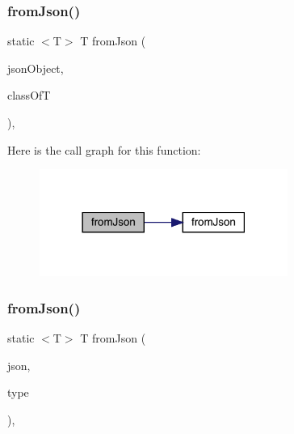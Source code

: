 \subsubsection{\texorpdfstring{from\+Json()}{fromJson()}\hspace{0.1cm}{\footnotesize\ttfamily [2/3]}}
{\footnotesize\ttfamily static $<$T$>$ T from\+Json (\begin{DoxyParamCaption}\item[{@Non\+Null J\+S\+O\+N\+Object}]{json\+Object,  }\item[{Class$<$ T $>$}]{class\+OfT }\end{DoxyParamCaption})\hspace{0.3cm}{\ttfamily [static]}, {\ttfamily [inherited]}}

Here is the call graph for this function\+:
\nopagebreak
\begin{figure}[H]
\begin{center}
\leavevmode
\includegraphics[width=230pt]{classcom_1_1toast_1_1android_1_1gamebase_1_1base_1_1_value_object_ab83c4196ee2e3f11553bbe0f04dc2101_cgraph}
\end{center}
\end{figure}
\mbox{\label{classcom_1_1toast_1_1android_1_1gamebase_1_1base_1_1_value_object_aa901d97d495150b54bcb80c05672f58a}} 
\subsubsection{\texorpdfstring{from\+Json()}{fromJson()}\hspace{0.1cm}{\footnotesize\ttfamily [3/3]}}
{\footnotesize\ttfamily static $<$T$>$ T from\+Json (\begin{DoxyParamCaption}\item[{@Non\+Null String}]{json,  }\item[{Type}]{type }\end{DoxyParamCaption})\hspace{0.3cm}{\ttfamily [static]}, {\ttfamily [inherited]}}

